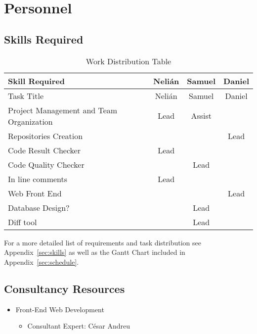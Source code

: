 \section{Personnel}

\subsection{Skills Required}
\begin{center}
\setlength{\extrarowheight}{1.5pt}
    \begin{longtable}{|m{3.25in}|c|c|c|}
 \caption{Work Distribution Table} \\
     \hline
    
    \centering Skill Required & Nelián & Samuel & Daniel \\
    \hline \hline \endfirsthead
    
         \hline

	\centering Task Title & Nelián & Samuel & Daniel \\    
	\hline \hline \endhead
    
    \endfoot    
    
    Project Management and Team Organization & Lead  & Assist &  \\ \hline
    Repositories Creation &       &       & Lead \\  \hline
    Code Result Checker & Lead  &       &  \\  \hline
    Code Quality Checker &       & Lead  &  \\  \hline
    In line comments & Lead  &       &  \\  \hline
    Web Front End &       &       & Lead \\  \hline
    Database Design? &       & Lead  &  \\  \hline
    Diff tool &       & Lead  &  \\  \hline
     \end{longtable}
\end{center}

For a more detailed list of requirements and task distribution see Appendix~\ref{sec:skills} as well as the Gantt Chart included in Appendix~\ref{sec:schedule}.
\subsection{Consultancy Resources}
\begin{itemize}
\item Front-End Web Development
\begin{itemize}
\item Consultant Expert: César Andreu
\end{itemize}
\end{itemize}
